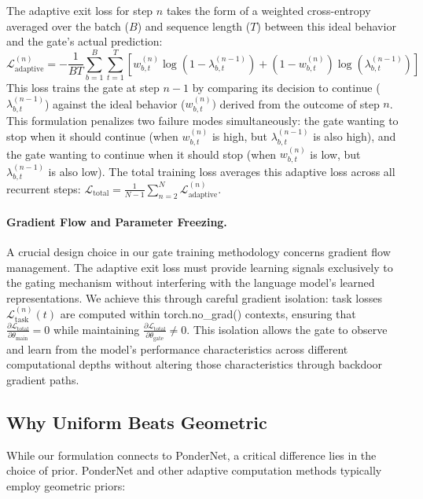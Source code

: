 \documentclass[]{bytedance_seed}
\newcommand{\1}{\mathbf{1}}
\begin{document}
The adaptive exit loss for step $n$ takes the form of a weighted cross-entropy averaged over the batch ($B$) and sequence length ($T$) between this ideal behavior and the gate's actual prediction:
$$\mathcal{L}_{\text{adaptive}}^{(n)} = -\frac{1}{BT}\sum_{b=1}^{B}\sum_{t=1}^{T} \left[ w^{(n)}_{b,t} \log(1-\lambda^{(n-1)}_{b,t}) + (1-w^{(n)}_{b,t}) \log(\lambda^{(n-1)}_{b,t}) \right]$$
This loss trains the gate at step $n-1$ by comparing its decision to continue ($\lambda^{(n-1)}_{b,t}$) against the ideal behavior ($w^{(n)}_{b,t})$ derived from the outcome of step $n$. This formulation penalizes two failure modes simultaneously: the gate wanting to stop when it should continue (when $w^{(n)}_{b,t}$ is high, but $\lambda^{(n-1)}_{b,t}$ is also high), and the gate wanting to continue when it should stop (when $w^{(n)}_{b,t}$ is low, but $\lambda^{(n-1)}_{b,t}$ is also low). The total training loss averages this adaptive loss across all recurrent steps: $\mathcal{L}_{\text{total}} = \frac{1}{N-1} \sum_{n=2}^{N} \mathcal{L}_{\text{adaptive}}^{(n)}$.

\paragraph{Gradient Flow and Parameter Freezing.}
A crucial design choice in our gate training methodology concerns gradient flow management. The adaptive exit loss must provide learning signals exclusively to the gating mechanism without interfering with the language model's learned representations. We achieve this through careful gradient isolation: task losses $\mathcal{L}_{\text{task}}^{(n)}(t)$ are computed within torch.no\_grad() contexts, ensuring that $\frac{\partial \mathcal{L}_{\text{total}}}{\partial \theta_{\text{main}}} = 0$ while maintaining $\frac{\partial \mathcal{L}_{\text{total}}}{\partial \theta_{\text{gate}}} \neq 0$. This isolation allows the gate to observe and learn from the model's performance characteristics across different computational depths without altering those characteristics through backdoor gradient paths.



\subsection{Why Uniform Beats Geometric}

While our formulation connects to PonderNet, a critical difference lies in the choice of prior. PonderNet and other adaptive computation methods typically employ geometric priors:
\end{document}
